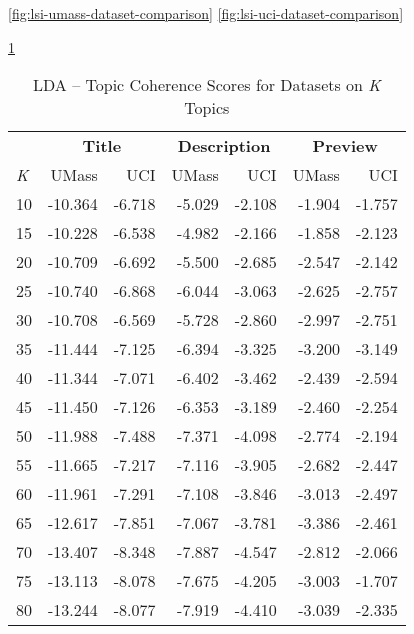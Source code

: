 \documentclass[letterpaper,12pt]{article}
\begin{document}
\ref{fig:lsi-umass-dataset-comparison}
\ref{fig:lsi-uci-dataset-comparison}


\ref{tab:lda_data_comp}
\begin{table}
	\caption{\label{tab:lda_data_comp} LDA -- Topic Coherence Scores for Datasets on \emph{K} Topics}
	\begin{center}
		\begin{tabular}{| l | rr | rr | rr |}
			\hline
			{} & \multicolumn{2}{c|}{\textbf{Title}} & \multicolumn{2}{c|}{\textbf{Description}} & \multicolumn{2}{c|}{\textbf{Preview}} \\
			\emph{K} &       UMass &    UCI &  UMass &    UCI &   UMass &    UCI \\
			\hline
				10  & -10.364 & -6.718 &      -5.029 & -2.108 &  -1.904 & -1.757 \\
				15  & -10.228 & -6.538 &      -4.982 & -2.166 &  -1.858 & -2.123 \\
				20  & -10.709 & -6.692 &      -5.500 & -2.685 &  -2.547 & -2.142 \\
				25  & -10.740 & -6.868 &      -6.044 & -3.063 &  -2.625 & -2.757 \\
				30  & -10.708 & -6.569 &      -5.728 & -2.860 &  -2.997 & -2.751 \\
				35  & -11.444 & -7.125 &      -6.394 & -3.325 &  -3.200 & -3.149 \\
				40  & -11.344 & -7.071 &      -6.402 & -3.462 &  -2.439 & -2.594 \\
				45  & -11.450 & -7.126 &      -6.353 & -3.189 &  -2.460 & -2.254 \\
				50  & -11.988 & -7.488 &      -7.371 & -4.098 &  -2.774 & -2.194 \\
				55  & -11.665 & -7.217 &      -7.116 & -3.905 &  -2.682 & -2.447 \\
				60  & -11.961 & -7.291 &      -7.108 & -3.846 &  -3.013 & -2.497 \\
				65  & -12.617 & -7.851 &      -7.067 & -3.781 &  -3.386 & -2.461 \\
				70  & -13.407 & -8.348 &      -7.887 & -4.547 &  -2.812 & -2.066 \\
				75  & -13.113 & -8.078 &      -7.675 & -4.205 &  -3.003 & -1.707 \\
				80  & -13.244 & -8.077 &      -7.919 & -4.410 &  -3.039 & -2.335 \\

\end{tabular}
\end{center}
\end{table}
\end{document}
